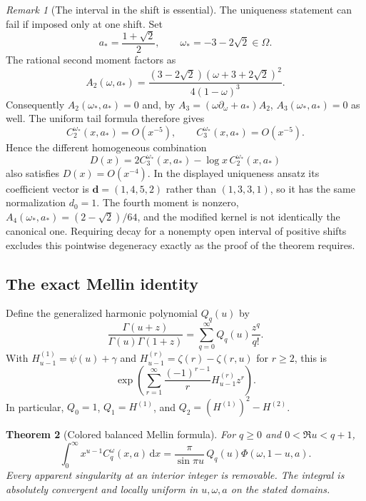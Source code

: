 \documentclass[11pt,a4paper]{article}
\numberwithin{equation}{section}
\newtheorem{theorem}{Theorem}[section]
\theoremstyle{definition}
\theoremstyle{remark}
\newtheorem{remark}[theorem]{Remark}
\newcommand{\dd}{\,\mathrm d}
\begin{document}
\begin{remark}[The interval in the shift is essential]
\label{col:pointwise-counterexample}
The uniqueness statement can fail if imposed only at one shift.
Set
\[
 a_* = \frac{1+\sqrt2}{2},\qquad
 \omega_*=-3-2\sqrt2\in\Omega.
\]
The rational second moment factors as
\[
 A_2(\omega,a_*)
  =\frac{(3-2\sqrt2)(\omega+3+2\sqrt2)^2}
          {4(1-\omega)^3}.
\]
Consequently $A_2(\omega_*,a_*)=0$ and, by
$A_3=(\omega\partial_\omega+a_*)A_2$,
$A_3(\omega_*,a_*)=0$ as well.
The uniform tail formula therefore gives
\[
 C_2^{\omega_*}(x,a_*)=O(x^{-5}),\qquad
 C_3^{\omega_*}(x,a_*)=O(x^{-5}).
\]
Hence the different homogeneous combination
\[
 D(x)=2C_3^{\omega_*}(x,a_*)
                  -\log x\,C_2^{\omega_*}(x,a_*)
\]
also satisfies $D(x)=O(x^{-4})$.  In the displayed uniqueness
ansatz its coefficient vector is
$\boldsymbol d=(1,4,5,2)$ rather than $(1,3,3,1)$, so it has
the same normalization $d_0=1$.  The fourth moment is nonzero,
$A_4(\omega_*,a_*)=(2-\sqrt2)/64$, and the modified kernel is
not identically the canonical one.  Requiring decay for a
nonempty open interval of positive shifts excludes this
pointwise degeneracy exactly as the proof of the theorem requires.
\end{remark}

\subsection{The exact Mellin identity}

Define the generalized harmonic polynomial $Q_q(u)$ by
\begin{equation}\label{col:Q}
 \frac{\Gamma(u+z)}{\Gamma(u)\Gamma(1+z)}
     =\sum_{q=0}^\infty Q_q(u)\frac{z^q}{q!}.
\end{equation}
With
$H_{u-1}^{(1)}=\psi(u)+\gamma$ and
$H_{u-1}^{(r)}=\zeta(r)-\zeta(r,u)$ for $r\ge2$, this is
\[
 \exp\!\left(\sum_{r=1}^\infty
          \frac{(-1)^{r-1}}r H_{u-1}^{(r)}z^r\right).
\]
In particular,
$Q_0=1$, $Q_1=H^{(1)}$, and
$Q_2=(H^{(1)})^2-H^{(2)}$.

\begin{theorem}[Colored balanced Mellin formula]\label{col:mellin}
For $q\ge0$ and $0<\Re u<q+1$,
\begin{equation}\label{col:mellin-formula}
 \boxed{\displaystyle
 \int_0^\infty x^{u-1}C_q^\omega(x,a)\dd x
  =\frac{\pi}{\sin\pi u}\,Q_q(u)\Phi(\omega,1-u,a).}
\end{equation}
Every apparent singularity at an interior integer is removable.
The integral is absolutely convergent and locally uniform in
$u,\omega,a$ on the stated domains.
\end{theorem}
\end{document}
